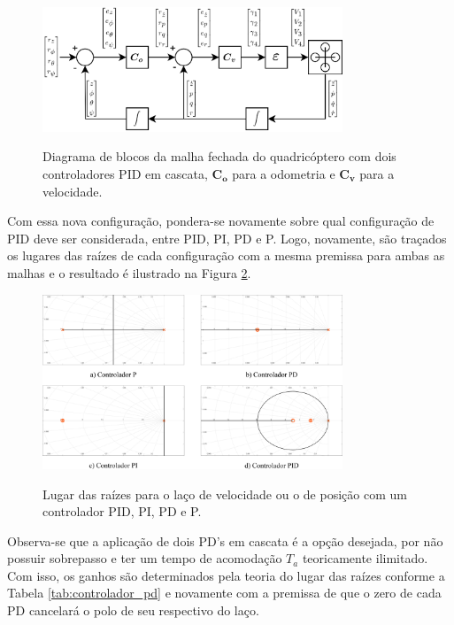 \documentclass[main.tex]{subfiles}
\begin{document}
	\begin{figure}[!h]
		\centering
		\caption{Diagrama de blocos da malha fechada do quadricóptero com dois controladores PID em cascata, $\boldsymbol{C_o}$ para a odometria e $\boldsymbol{C_v}$ para a velocidade.}
		\includegraphics[width=0.8\textwidth]{capitulos/controle_atitude/imgs/controlador_cascata_pid.png}
		\label{fig:controlador_cascata_pid}
	\end{figure}
	
	Com essa nova configuração, pondera-se novamente sobre qual configuração de PID deve ser considerada, entre PID, PI, PD e P. Logo, novamente, são traçados os lugares das raízes de cada configuração com a mesma premissa para ambas as malhas e o resultado é ilustrado na Figura \ref{fig:lugar_raizes_bom}.
	
	\begin{figure}[!h]
		\centering
		\caption{Lugar das raízes para o laço de velocidade ou o de posição com um controlador PID, PI, PD e P.}
		\includegraphics[width=0.8\textwidth]{capitulos/controle_atitude/imgs/lugar_raizes_bom.png}
		\label{fig:lugar_raizes_bom}
	\end{figure}
	
	Observa-se que a aplicação de dois PD's em cascata é a opção desejada, por não possuir sobrepasso e ter um tempo de acomodação $T_a$ teoricamente ilimitado. Com isso, os ganhos são determinados pela teoria do lugar das raízes \cite{controle_ufrgs} conforme a Tabela \ref{tab:controlador_pd} e novamente com a premissa de que o zero de cada PD cancelará o polo de seu respectivo do laço.
	
\end{document}
